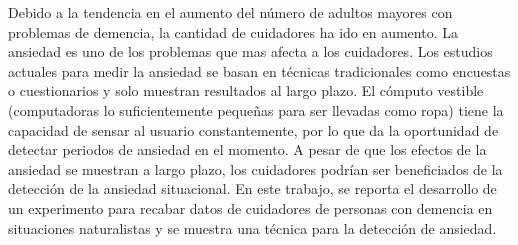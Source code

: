 Debido a la tendencia en el aumento del n\'umero de adultos mayores con problemas de demencia, la cantidad de cuidadores ha ido en aumento. La ansiedad es uno de los problemas que mas afecta a los cuidadores. Los estudios actuales para medir la ansiedad se basan en t\'ecnicas tradicionales como encuestas o cuestionarios y solo muestran resultados al largo plazo. El c\'omputo vestible (computadoras lo suficientemente peque\~nas para ser llevadas como ropa) tiene la capacidad de sensar al usuario constantemente, por lo que da la oportunidad de detectar periodos de ansiedad en el momento. A pesar de que los efectos de la ansiedad se muestran a largo plazo, los cuidadores podr\'ian ser beneficiados de la detecci\'on de la ansiedad situacional. En este trabajo, se reporta el desarrollo de un experimento para recabar datos de cuidadores de personas con demencia en situaciones naturalistas y se muestra una t\'ecnica para la detecci\'on de ansiedad.
